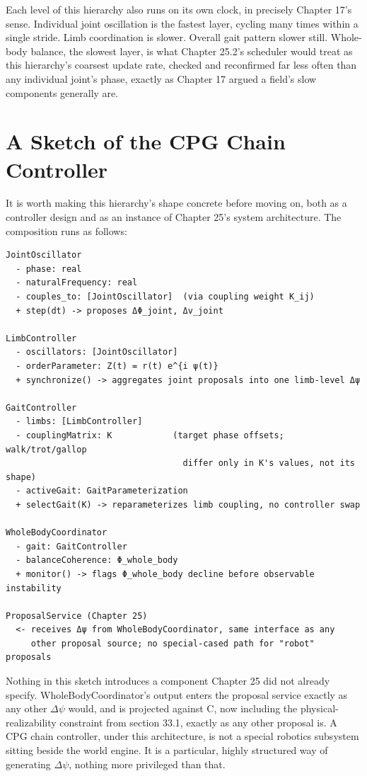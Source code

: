 Each level of this hierarchy also runs on its own clock, in precisely Chapter 17's sense. Individual joint oscillation is the fastest layer, cycling many times within a single stride. Limb coordination is slower. Overall gait pattern slower still. Whole-body balance, the slowest layer, is what Chapter 25.2's scheduler would treat as this hierarchy's coarsest update rate, checked and reconfirmed far less often than any individual joint's phase, exactly as Chapter 17 argued a field's slow components generally are.

\section{A Sketch of the CPG Chain Controller}

It is worth making this hierarchy's shape concrete before moving on, both as a controller design and as an instance of Chapter 25's system architecture. The composition runs as follows:

\begin{Verbatim}[breaklines=true, breaksymbolleft={}, fontsize=\small]
JointOscillator
  - phase: real
  - naturalFrequency: real
  - couples_to: [JointOscillator]  (via coupling weight K_ij)
  + step(dt) -> proposes ΔΦ_joint, Δv_joint

LimbController
  - oscillators: [JointOscillator]
  - orderParameter: Z(t) = r(t) e^{i ψ(t)}
  + synchronize() -> aggregates joint proposals into one limb-level Δψ

GaitController
  - limbs: [LimbController]
  - couplingMatrix: K            (target phase offsets; walk/trot/gallop
                                   differ only in K's values, not its shape)
  - activeGait: GaitParameterization
  + selectGait(K) -> reparameterizes limb coupling, no controller swap

WholeBodyCoordinator
  - gait: GaitController
  - balanceCoherence: Φ_whole_body
  + monitor() -> flags Φ_whole_body decline before observable instability

ProposalService (Chapter 25)
  <- receives Δψ from WholeBodyCoordinator, same interface as any
     other proposal source; no special-cased path for "robot" proposals
\end{Verbatim}

Nothing in this sketch introduces a component Chapter 25 did not already specify. WholeBodyCoordinator's output enters the proposal service exactly as any other \(\Delta\psi\) would, and is projected against C, now including the physical-realizability constraint from section 33.1, exactly as any other proposal is. A CPG chain controller, under this architecture, is not a special robotics subsystem sitting beside the world engine. It is a particular, highly structured way of generating \(\Delta\psi\), nothing more privileged than that.

